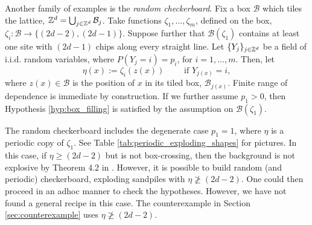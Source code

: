 \documentclass[12pt]{amsart}
\begin{document}
Another family of examples is the {\it random checkerboard}. Fix a box $\mathcal{B}$ which tiles the lattice, $\mathbb{Z}^d = \bigcup_{j \in \mathbb{Z}^d} \mathcal{B}_j$.  Take functions $\zeta_1, \ldots, \zeta_m$, defined on the box,  $\zeta_i: \mathcal{B} \to \{ (2 d - 2), (2 d - 1)\}$. Suppose further that $\mathcal{B}(\zeta_1)$ contains at least one site 
with $(2d-1)$ chips along every straight line.  Let $\{Y_j\}_{j \in \mathbb{Z}^d}$ be a field of i.i.d. random variables, where $P(Y_j = i) = p_i$, for $i = 1, \ldots, m$. 
Then, let 
\begin{equation} \label{eq:random_checkerboard}
\eta(x) := \zeta_i(z(x)) \qquad \mbox{ if $Y_{j(x)} = i$}, 
\end{equation}
where $z(x)  \in \mathcal{B}$ is the position of $x$ in its tiled box, $\mathcal{B}_{j(x)}$. 
Finite range
of dependence is immediate by construction. If we further assume $p_1 > 0$, then Hypothesis \ref{hyp:box_filling} is satisfied by the assumption on $\mathcal{B}(\zeta_1)$. 


The random checkerboard includes the degenerate case $p_1 = 1$, where $\eta$ is a periodic copy of $\zeta_1$. 
See Table \ref{tab:periodic_exploding_shapes} for pictures. 
In this case, if $\eta \geq (2 d- 2)$ but is not box-crossing, then the background is not explosive by
Theorem 4.2 in \cite{fey2010growth}. However, it is possible to build random (and periodic) checkerboard, exploding sandpiles with $\eta \not \geq (2 d - 2)$. One could then proceed in an adhoc 
manner to check the hypotheses.  However, we have not found a general recipe in this case. The counterexample in Section \ref{sec:counterexample} uses $\eta \not \geq (2d - 2)$.  
\end{document}
